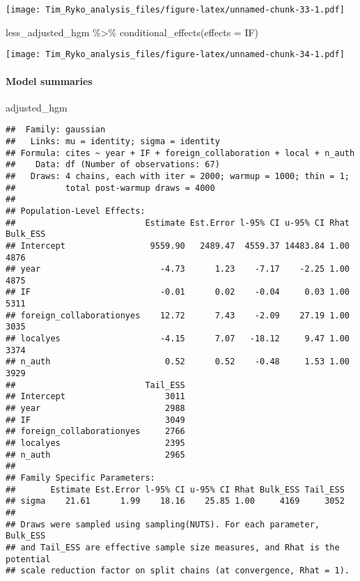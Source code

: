 \documentclass[
]{article}
\newenvironment{Shaded}{\begin{snugshade}}{\end{snugshade}}
\newcommand{\AttributeTok}[1]{\textcolor[rgb]{0.77,0.63,0.00}{#1}}
\newcommand{\FunctionTok}[1]{\textcolor[rgb]{0.00,0.00,0.00}{#1}}
\newcommand{\NormalTok}[1]{#1}
\newcommand{\SpecialCharTok}[1]{\textcolor[rgb]{0.00,0.00,0.00}{#1}}
\newcommand{\StringTok}[1]{\textcolor[rgb]{0.31,0.60,0.02}{#1}}
\begin{document}
\texttt{[image: Tim\_Ryko\_analysis\_files/figure-latex/unnamed-chunk-33-1.pdf]}

\begin{Shaded}
\begin{Highlighting}[]
\NormalTok{less\_adjusted\_hgm }\SpecialCharTok{\%\textgreater{}\%} \FunctionTok{conditional\_effects}\NormalTok{(}\AttributeTok{effects =} \StringTok{\textquotesingle{}IF\textquotesingle{}}\NormalTok{)}
\end{Highlighting}
\end{Shaded}

\texttt{[image: Tim\_Ryko\_analysis\_files/figure-latex/unnamed-chunk-34-1.pdf]}

\hypertarget{model-summaries-1}{%
\paragraph{Model summaries}\label{model-summaries-1}}

\begin{Shaded}
\begin{Highlighting}[]
\NormalTok{adjusted\_hgm}
\end{Highlighting}
\end{Shaded}

\begin{verbatim}
##  Family: gaussian 
##   Links: mu = identity; sigma = identity 
## Formula: cites ~ year + IF + foreign_collaboration + local + n_auth 
##    Data: df (Number of observations: 67) 
##   Draws: 4 chains, each with iter = 2000; warmup = 1000; thin = 1;
##          total post-warmup draws = 4000
## 
## Population-Level Effects: 
##                          Estimate Est.Error l-95% CI u-95% CI Rhat Bulk_ESS
## Intercept                 9559.90   2489.47  4559.37 14483.84 1.00     4876
## year                        -4.73      1.23    -7.17    -2.25 1.00     4875
## IF                          -0.01      0.02    -0.04     0.03 1.00     5311
## foreign_collaborationyes    12.72      7.43    -2.09    27.19 1.00     3035
## localyes                    -4.15      7.07   -18.12     9.47 1.00     3374
## n_auth                       0.52      0.52    -0.48     1.53 1.00     3929
##                          Tail_ESS
## Intercept                    3011
## year                         2988
## IF                           3049
## foreign_collaborationyes     2766
## localyes                     2395
## n_auth                       2965
## 
## Family Specific Parameters: 
##       Estimate Est.Error l-95% CI u-95% CI Rhat Bulk_ESS Tail_ESS
## sigma    21.61      1.99    18.16    25.85 1.00     4169     3052
## 
## Draws were sampled using sampling(NUTS). For each parameter, Bulk_ESS
## and Tail_ESS are effective sample size measures, and Rhat is the potential
## scale reduction factor on split chains (at convergence, Rhat = 1).
\end{verbatim}
\end{document}
